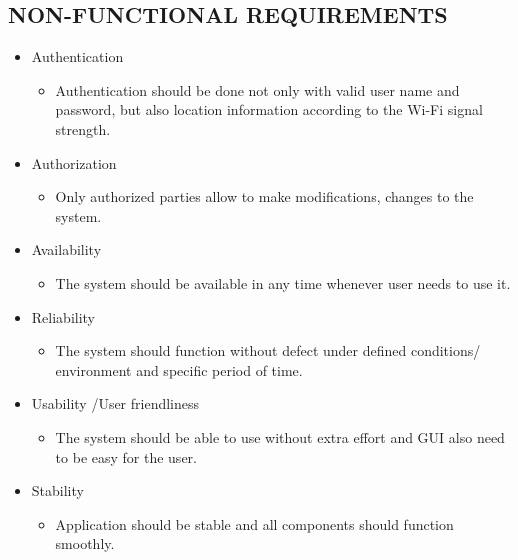 \subsection{NON-FUNCTIONAL REQUIREMENTS}
\begin{itemize}
	\item Authentication
	\begin{itemize}
		\item Authentication should be done not only with valid user name and password, but also location information according to the Wi-Fi signal strength.
	\end{itemize}
	\item Authorization
	\begin{itemize}
		\item Only authorized parties allow to make modifications, changes to the system.
	\end{itemize}
	\item Availability
	\begin{itemize}
		\item The system should be available in any time whenever user needs to use it.
	\end{itemize}

	\item Reliability
	\begin{itemize}
		\item The system should function without defect under defined conditions/ environment and specific period of time.
	\end{itemize}
	
	\item Usability /User friendliness
	\begin{itemize}
		\item The system should be able to use without extra effort and GUI also need to be easy for the user.
	\end{itemize}
	
	\item Stability
	\begin{itemize}
		\item Application should be stable and all components should function smoothly.
	\end{itemize}
	
\end{itemize}